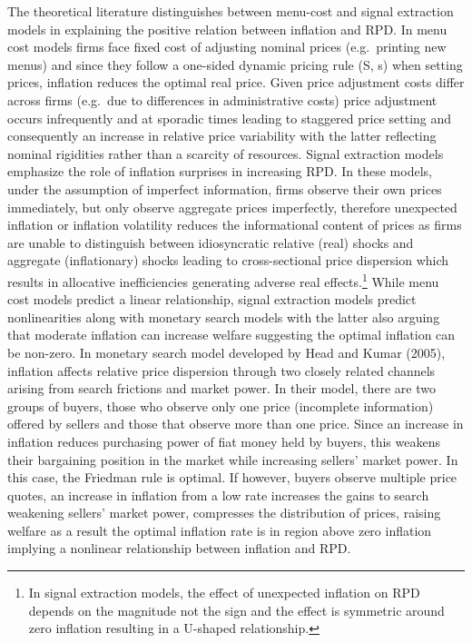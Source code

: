 \documentclass[
  letterpaper,
  DIV=11,
  numbers=noendperiod]{scrartcl}
\begin{document}
The theoretical literature distinguishes between menu-cost and signal
extraction models in explaining the positive relation between inflation
and RPD. In menu cost models
\citep{sheshinki1979, sheshinski1983, rotemberg1983, benabou1992} firms
face fixed cost of adjusting nominal prices (e.g.~printing new menus)
and since they follow a one-sided dynamic pricing rule (S, s) when
setting prices, inflation reduces the optimal real price. Given price
adjustment costs differ across firms (e.g.~due to differences in
administrative costs) price adjustment occurs infrequently and at
sporadic times leading to staggered price setting and consequently an
increase in relative price variability with the latter reflecting
nominal rigidities rather than a scarcity of resources. Signal
extraction models emphasize the role of inflation surprises in
increasing RPD. In these models, under the assumption of imperfect
information, firms observe their own prices immediately, but only
observe aggregate prices imperfectly, therefore unexpected inflation or
inflation volatility reduces the informational content of prices as
firms are unable to distinguish between idiosyncratic relative (real)
shocks and aggregate (inflationary) shocks
\citep{lucas1973, hercowitz1981, cukierman1983, barro1976} leading to
cross-sectional price dispersion which results in allocative
inefficiencies generating adverse real effects.\footnote{In signal
  extraction models, the effect of unexpected inflation on RPD depends
  on the magnitude not the sign and the effect is symmetric around zero
  inflation resulting in a U-shaped relationship.} While menu cost
models predict a linear relationship, signal extraction models predict
nonlinearities along with monetary search models \citep{head2005} with
the latter also arguing that moderate inflation can increase welfare
suggesting the optimal inflation can be non-zero. In monetary search
model developed by Head and Kumar (2005), inflation affects relative
price dispersion through two closely related channels arising from
search frictions and market power. In their model, there are two groups
of buyers, those who observe only one price (incomplete information)
offered by sellers and those that observe more than one price. Since an
increase in inflation reduces purchasing power of fiat money held by
buyers, this weakens their bargaining position in the market while
increasing sellers' market power. In this case, the Friedman rule is
optimal. If however, buyers observe multiple price quotes, an increase
in inflation from a low rate increases the gains to search weakening
sellers' market power, compresses the distribution of prices, raising
welfare as a result the optimal inflation rate is in region above zero
inflation implying a nonlinear relationship between inflation and RPD.
\end{document}
